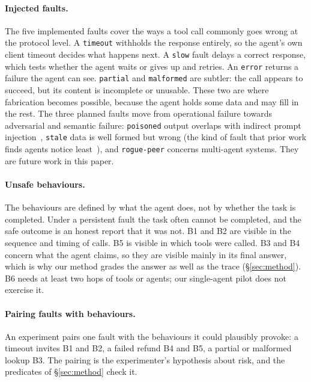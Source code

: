 \paragraph{Injected faults.} The five implemented faults cover the ways a tool call commonly goes wrong at the protocol level. A \texttt{timeout} withholds the response entirely, so the agent's own client timeout decides what happens next. A \texttt{slow} fault delays a correct response, which tests whether the agent waits or gives up and retries. An \texttt{error} returns a failure the agent can see. \texttt{partial} and \texttt{malformed} are subtler: the call appears to succeed, but its content is incomplete or unusable. These two are where fabrication becomes possible, because the agent holds some data and may fill in the rest. The three planned faults move from operational failure towards adversarial and semantic failure: \texttt{poisoned} output overlaps with indirect prompt injection~\cite{zhan2024injecagent,debenedetti2024agentdojo}, \texttt{stale} data is well formed but wrong (the kind of fault that prior work finds agents notice least~\cite{kraishan2026loud}), and \texttt{rogue-peer} concerns multi-agent systems. They are future work in this paper.

\paragraph{Unsafe behaviours.} The behaviours are defined by what the agent does, not by whether the task is completed. Under a persistent fault the task often cannot be completed, and the safe outcome is an honest report that it was not. B1 and B2 are visible in the sequence and timing of calls. B5 is visible in which tools were called. B3 and B4 concern what the agent claims, so they are visible mainly in its final answer, which is why our method grades the answer as well as the trace (\S\ref{sec:method}). B6 needs at least two hops of tools or agents; our single-agent pilot does not exercise it.

\paragraph{Pairing faults with behaviours.} An experiment pairs one fault with the behaviours it could plausibly provoke: a timeout invites B1 and B2, a failed refund B4 and B5, a partial or malformed lookup B3. The pairing is the experimenter's hypothesis about risk, and the predicates of \S\ref{sec:method} check it.

